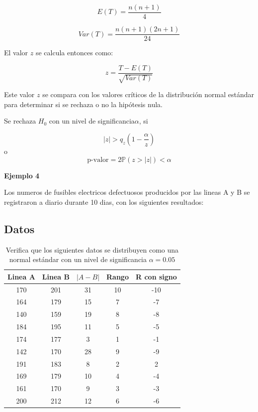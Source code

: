 \documentclass{article}
\begin{document}
\[
    E(T) = \frac{n(n + 1)}{4}
\]

\[
    Var(T) = \frac{n(n + 1)(2n + 1)}{24}
\]

El valor $z$ se calcula entonces como:

\[
    z = \frac{T - E(T)}{\sqrt{Var(T)}}
\]

Este valor $z$ se compara con los valores críticos de la distribución normal estándar para determinar si se rechaza o no la hipótesis nula.


Se rechaza $H_0$ con un nivel de significancia$\alpha$, si

\[|z| > q_z(1-\frac{\alpha}{z})\]
o
\[\text{p-valor} = 2\mathbb{P}(z > |z|) < \alpha\]

\textbf{Ejemplo 4}

Los numeros de fusibles electricos defectuosos producidos por las lineas A y B se registraron a diario durante 10 dias, con los siguientes resultados:

\subsection*{Datos}
\begin{table}[ht]
    \centering
    \caption{Verifica que los siguientes datos se distribuyen como una normal estándar con un nivel de significancia $\alpha=0.05$}
    \begin{tabular}{ccccc}
        \toprule
        Linea A & Linea B & $| A - B|$ & Rango & R con signo \\
        \midrule
        170     & 201     & 31         & 10    & -10         \\
        164     & 179     & 15         & 7     & -7          \\
        140     & 159     & 19         & 8     & -8          \\
        184     & 195     & 11         & 5     & -5          \\
        174     & 177     & 3          & 1     & -1          \\
        142     & 170     & 28         & 9     & -9          \\
        191     & 183     & 8          & 2     & 2           \\
        169     & 179     & 10         & 4     & -4          \\
        161     & 170     & 9          & 3     & -3          \\
        200     & 212     & 12         & 6     & -6          \\
        \bottomrule
    \end{tabular}
\end{table}
\end{document}
